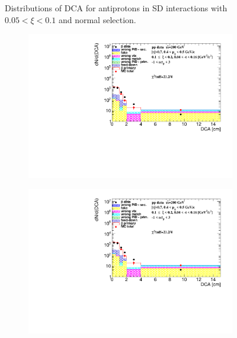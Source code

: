 \begin{figure}[h!]
\begin{subfigure}{.45\textwidth}
	\end{subfigure}
	\caption{Distributions of DCA for antiprotons in SD interactions with $0.05 < \xi<0.1$ and normal selection.}
	\label{fig:dca_proton_bar_1t}
\end{figure}
\begin{figure}[h!]
	\centering
	\begin{subfigure}{.45\textwidth}
		\includegraphics[width=\linewidth, page=1]{chapters/chrgSTAR/img/DCAproton/background_p_bar_2.pdf}
	\end{subfigure}
	\begin{subfigure}{.45\textwidth}
		\includegraphics[width=\linewidth, page=2]{chapters/chrgSTAR/img/DCAproton/background_p_bar_2.pdf}
	\end{subfigure}
	\begin{subfigure}{.45\textwidth}

\end{subfigure}
\end{figure}
